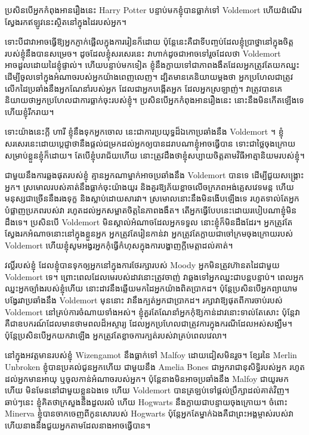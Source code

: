 \begin{writtenNote}
ប្រសិនបើអ្នកកំពុងអានរឿងនេះ Harry Potter បន្ទាប់មកខ្ញុំបានធ្លាក់ទៅ Voldemort ហើយដំណើរស្វែងរកឥឡូវនេះស្ថិតនៅក្នុងដៃរបស់អ្នក។

ទោះបីជាវាអាចធ្វើឱ្យអ្នកភ្ញាក់ផ្អើលក្នុងការរៀនក៏ដោយ ប៉ុន្តែនេះគឺជាទីបញ្ចប់ដែលខ្ញុំប្រាថ្នានៅក្នុងចិត្តរបស់ខ្ញុំនឹងបានសម្រេច។ ដូចដែលខ្ញុំសរសេរនេះ វាហាក់ដូចជាអាចទៅរួចដែលថា Voldemort អាចដួលដោយដៃខ្ញុំផ្ទាល់។ ហើយបន្ទាប់មកទៀត ខ្ញុំនឹងក្លាយទៅជាភាពងងឹតដែលអ្នកត្រូវតែយកឈ្នះ ដើម្បីចូលទៅក្នុងអំណាចរបស់អ្នកយ៉ាងពេញលេញ។ ដ្បិតមានគេនិយាយម្តងថា អ្នកប្រហែលជាត្រូវលើកដៃប្រឆាំងនឹងអ្នកណែនាំរបស់អ្នក ដែលជាអ្នកបង្កើតអ្នក ដែលអ្នកស្រឡាញ់។ វាត្រូវបានគេនិយាយថាអ្នកប្រហែលជាការធ្លាក់ចុះរបស់ខ្ញុំ។ ប្រសិនបើអ្នកកំពុងអានរឿងនេះ នោះនឹងមិនកើតឡើងទេ ហើយខ្ញុំរីករាយ។

ទោះយ៉ាងនេះក្តី ហារី ខ្ញុំនឹងទុកអ្នកចោល នេះជាការប្រយុទ្ធដ៏ឯកោប្រឆាំងនឹង Voldemort ។ ខ្ញុំ​សរសេរ​នេះ​ដោយ​ប្តេជ្ញា​ថា​នឹង​ផ្តល់​ជម្រក​ដល់​អ្នក​ឲ្យ​បាន​ដរាប​ណា​ខ្ញុំ​អាច​ធ្វើ​បាន ទោះ​ជា​ថ្លៃ​ចុងក្រោយ​សម្រាប់​ខ្លួន​ខ្ញុំ​ក៏​ដោយ។ តែ​បើ​ខ្ញុំ​បរាជ័យ​ហើយ នោះ​ត្រូវ​ដឹង​ថា​ខ្ញុំ​សប្បាយ​ចិត្ត​តាម​វិធី​អាត្មានិយម​របស់​ខ្ញុំ។

ជាមួយនឹងការឆ្លងផុតរបស់ខ្ញុំ គ្មានអ្នកណាម្នាក់អាចប្រឆាំងនឹង Voldemort បានទេ ដើម្បីជួយសង្រ្គោះអ្នក។ ស្រមោលរបស់គាត់នឹងធ្លាក់ចុះយ៉ាងយូរ និងគួរឱ្យភ័យខ្លាចលើចក្រភពអង់គ្លេសវេទមន្ត ហើយមនុស្សជាច្រើននឹងរងទុក្ខ និងស្លាប់ដោយសារវា។ ស្រមោល​នោះ​នឹង​មិន​ងើប​ឡើង​ទេ រហូត​ទាល់​តែ​អ្នក​បំផ្លាញ​ប្រភព​របស់​វា រហូត​ដល់​អ្នក​សម្អាត​ចិត្ត​នៃ​ភាព​ងងឹត។ តើ​អ្នក​ធ្វើ​បែប​នេះ​ដោយ​របៀប​ណា​ខ្ញុំ​មិន​ដឹង​ទេ។ ប្រសិនបើ Voldemort មិនស្គាល់អំណាចដែលអ្នកទទួល នោះខ្ញុំក៏មិនដឹងដែរ។ អ្នកត្រូវតែស្វែងរកអំណាចនោះនៅក្នុងខ្លួនអ្នក អ្នកត្រូវតែរៀនកាន់វា អ្នកត្រូវតែក្លាយជាចៅក្រមចុងក្រោយរបស់ Voldemort ហើយខ្ញុំសូមអង្វរអ្នកកុំធ្វើកំហុសក្នុងការបង្ហាញក្តីមេត្តាដល់គាត់។

វល្លិ៍របស់ខ្ញុំ ដែលខ្ញុំបានទុកឲ្យអ្នកនៅក្នុងការថែរក្សារបស់ Moody អ្នកមិនត្រូវហ៊ានតដៃជាមួយ Voldemort ទេ។ ព្រោះ​ពេល​ដែល​មេ​របស់​ដាវ​នោះ​ត្រូវ​ចាញ់ វា​ឆ្លង​ទៅ​អ្នក​ឈ្នះ​ជា​បន្តបន្ទាប់។ ពេល​អ្នក​ឈ្នះ​អ្នក​ច្បាំង​របស់​ខ្ញុំ​ហើយ នោះ​ដាវ​នឹង​ឆ្លើយ​មក​ដៃ​អ្នក​យ៉ាង​ពិត​ប្រាកដ។ ប៉ុន្តែប្រសិនបើអ្នកព្យាយាមបង្វែរវាប្រឆាំងនឹង Voldemort មុននោះ វានឹងក្បត់អ្នកជាប្រាកដ។ រក្សាវាឱ្យផុតពីការចាប់របស់ Voldemort នៅគ្រប់ការចំណាយទាំងអស់។ ខ្ញុំគួរតែណែនាំអ្នកកុំឱ្យកាន់ដាវនោះទាល់តែសោះ ប៉ុន្តែវាគឺជាឧបករណ៍ដែលមានថាមពលដ៏អស្ចារ្យ ដែលអ្នកប្រហែលជាត្រូវការក្នុងករណីដែលអស់សង្ឃឹម។ ប៉ុន្តែប្រសិនបើអ្នកយកវាឡើង អ្នកត្រូវតែខ្លាចការក្បត់របស់វាគ្រប់ពេលវេលា។

នៅក្នុងអវត្តមានរបស់ខ្ញុំ Wizengamot នឹងធ្លាក់ទៅ Malfoy ដោយជៀសមិនរួច។ ខ្សែរនៃ Merlin Unbroken ខ្ញុំបានប្រគល់ជូនអ្នកហើយ ជាមួយនឹង Amelia Bones ជាអ្នករាជានុសិទ្ធិរបស់អ្នក រហូតដល់អ្នកមានអាយុ ឬចូលកាន់អំណាចរបស់អ្នក។ ប៉ុន្តែ​នាង​មិន​អាច​ប្រឆាំង​នឹង Malfoy ជា​យូរ​មក​ហើយ មិនមែន​នៅ​ជាមួយ​ខ្លួន​ឯង​ទេ ហើយ Voldemort បាន​ត្រឡប់​ទៅ​ផ្តល់​ប្រឹក្សា​ដល់​គាត់​វិញ។ ឆាប់ៗនេះ ខ្ញុំគិតថាក្រសួងនឹងដួលរលំ ហើយ Hogwarts នឹងក្លាយជាបន្ទាយចុងក្រោយ។ ចំពោះ Minerva ខ្ញុំបានចាកចេញពីកូនសោរបស់ Hogwarts ប៉ុន្តែអ្នកតែម្នាក់ឯងគឺជាព្រះអង្គម្ចាស់របស់វា ហើយនាងនឹងជួយអ្នកតាមដែលនាងអាចធ្វើបាន។


\end{writtenNote}
